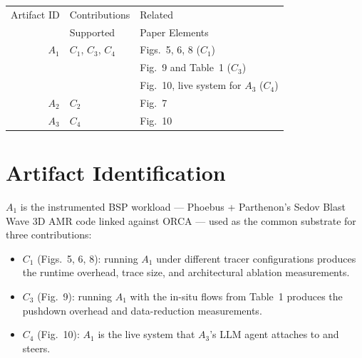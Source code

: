 \documentclass[nonacm,sigconf]{acmart}
\begin{document}
\begin{center}
	\begin{tabular}{rll}
		\toprule
		Artifact ID & Contributions       & Related                                \\
		            & Supported           & Paper Elements                         \\
		\midrule
		$A_1$       & $C_1$, $C_3$, $C_4$ & Figs.~5, 6, 8 ($C_1$)                  \\
		            &                     & Fig.~9 and Table~1 ($C_3$)             \\
		            &                     & Fig.~10, live system for $A_3$ ($C_4$) \\
		\midrule
		$A_2$       & $C_2$               & Fig.~7                                 \\
		\midrule
		$A_3$       & $C_4$               & Fig.~10                                \\
		\bottomrule
	\end{tabular}
\end{center}

\section{Artifact Identification}

\newartifact

\artrel

$A_1$ is the instrumented BSP workload --- Phoebus + Parthenon's Sedov Blast Wave 3D AMR code linked against ORCA --- used as the common substrate for three contributions:

\begin{itemize}
	\item $C_1$ (Figs.~5, 6, 8): running $A_1$ under different tracer configurations produces the runtime overhead, trace size, and architectural ablation measurements.
	\item $C_3$ (Fig.~9): running $A_1$ with the in-situ flows from Table~1 produces the pushdown overhead and data-reduction measurements.
	\item $C_4$ (Fig.~10): $A_1$ is the live system that $A_3$'s LLM agent attaches to and steers.
\end{itemize}
\end{document}
